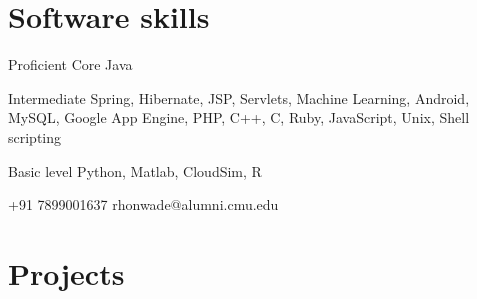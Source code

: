 \documentclass{tccv}
\begin{document}
\vspace{-0.2in}
\section{Software skills}
\begin{factlist}
\item{Proficient}
     {Core Java}       

\item{Intermediate}
     {Spring, Hibernate, JSP, Servlets, Machine Learning, Android, MySQL, Google App Engine, PHP, C++, C, Ruby, JavaScript, Unix, Shell scripting}

\item{Basic level}
     {Python, Matlab, CloudSim, R}
\end{factlist}

    {+91 7899001637}
    {rhonwade@alumni.cmu.edu}

\section{Projects}
\end{document}
